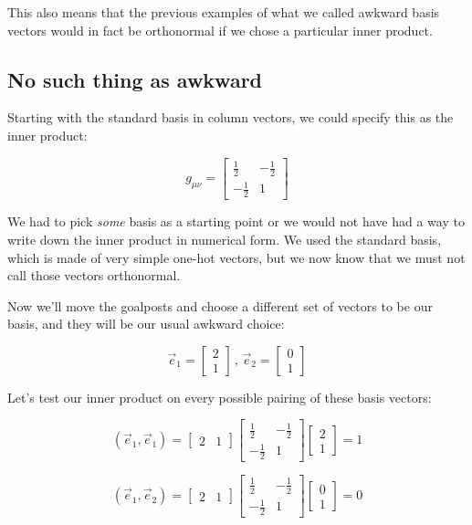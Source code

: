 This also means that the previous examples of what we called awkward basis vectors would in fact be orthonormal if we chose a particular inner product.

\subsection{No such thing as awkward}

Starting with the standard basis in column vectors, we could specify this as the inner product:

$$
g_{\mu\nu} = 
\begin{bmatrix}
\frac{1}{2} & -\frac{1}{2} \\
-\frac{1}{2} & 1
\end{bmatrix}
$$

We had to pick \textit{some} basis as a starting point or we would not have had a way to write down the inner product in numerical form. We used the standard basis, which is made of very simple one-hot vectors, but we now know that we must not call those vectors orthonormal.

Now we'll move the goalposts and choose a different set of vectors to be our basis, and they will be our usual awkward choice:

$$
\vec{e}_1 = \begin{bmatrix}2 \\ 1\end{bmatrix}\,,\,
\vec{e}_2 = \begin{bmatrix}0 \\ 1\end{bmatrix}
$$

Let's test our inner product on every possible pairing of these basis vectors:

$$
(\vec{e}_1, \vec{e}_1) =
\begin{bmatrix}
2 & 1
\end{bmatrix}
\begin{bmatrix}
\frac{1}{2} & -\frac{1}{2} \\
-\frac{1}{2} & 1
\end{bmatrix}
\begin{bmatrix}
2 \\ 1
\end{bmatrix}
= 1
$$    

$$
(\vec{e}_1, \vec{e}_2) =
\begin{bmatrix}
2 & 1
\end{bmatrix}
\begin{bmatrix}
\frac{1}{2} & -\frac{1}{2} \\
-\frac{1}{2} & 1
\end{bmatrix}
\begin{bmatrix}
0 \\ 1
\end{bmatrix}
= 0
$$    

